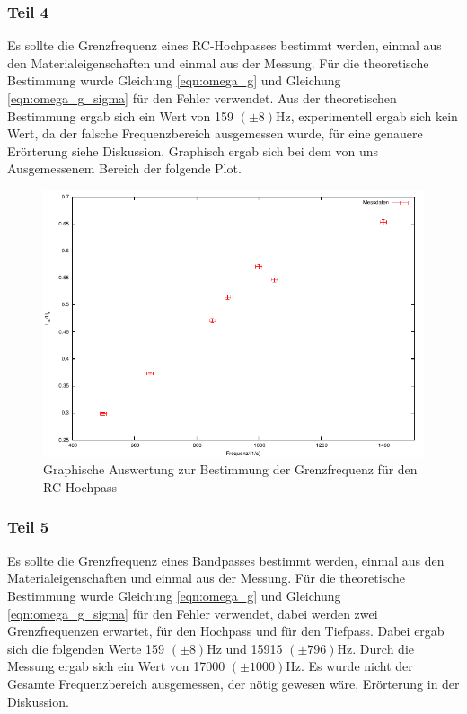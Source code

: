 \documentclass[12pt]{scrartcl}
\begin{document}
\newpage

\subsubsection{Teil 4}
Es sollte die Grenzfrequenz eines RC-Hochpasses bestimmt werden, einmal aus den Materialeigenschaften und einmal aus der Messung. Für die theoretische Bestimmung wurde Gleichung \ref{eqn:omega_g} und Gleichung \ref{eqn:omega_g_sigma} für den Fehler verwendet.
Aus der theoretischen Bestimmung ergab sich ein Wert von 159 $(\pm 8)$Hz, experimentell ergab sich kein Wert, da der falsche Frequenzbereich ausgemessen wurde, für eine genauere Erörterung siehe Diskussion. Graphisch ergab sich bei dem von uns Ausgemessenem Bereich der folgende Plot.

\begin{figure}[htbp] 
  \centering
    \includegraphics[scale = 1]{teil_4.pdf}
  	\caption[Graphische Auswertung zur Bestimmung der Grenzfrequenz für den RC-Hochpass]{Graphische Auswertung zur Bestimmung der Grenzfrequenz für den RC-Hochpass}
  \label{fig:teil_4}
\end{figure}

\newpage

\subsubsection{Teil 5}
Es sollte die Grenzfrequenz eines Bandpasses bestimmt werden, einmal aus den Materialeigenschaften und einmal aus der Messung. Für die theoretische Bestimmung wurde Gleichung \ref{eqn:omega_g} und Gleichung \ref{eqn:omega_g_sigma} für den Fehler verwendet, dabei werden zwei Grenzfrequenzen erwartet, für den Hochpass und für den Tiefpass. Dabei ergab sich die folgenden Werte 159 $(\pm 8)$Hz und 15915 $(\pm 796)$Hz. Durch die Messung ergab sich ein Wert von 17000 $(\pm 1000)$Hz. Es wurde nicht der Gesamte Frequenzbereich ausgemessen, der nötig gewesen wäre, Erörterung in der Diskussion.
\end{document}
